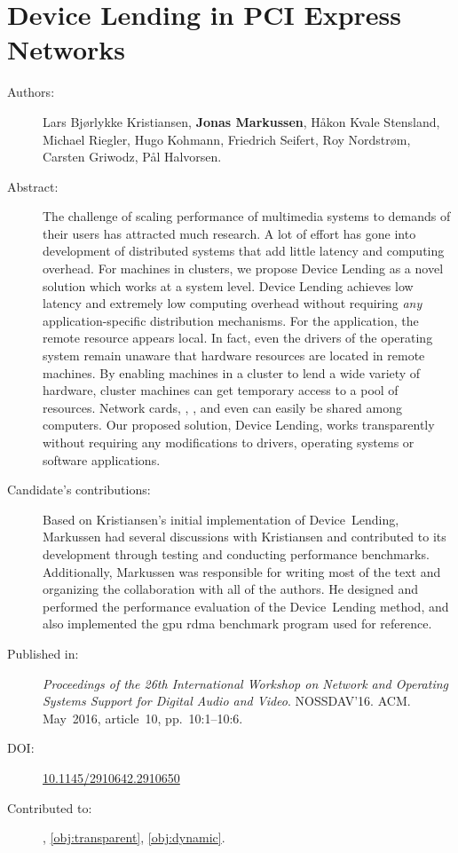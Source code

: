 \chapter{Device Lending in PCI Express Networks}
\label{paper:nossdav}
\paperthumb

\begin{description}
	\item[Authors:]
		Lars Bj{\o}rlykke Kristiansen, \textbf{Jonas Markussen}, H{\aa}kon Kvale Stensland,
		Michael Riegler, Hugo Kohmann, Friedrich Seifert, Roy Nordstr{\o}m, Carsten Griwodz, P{\aa}l Halvorsen.

	\item[Abstract:]
		The challenge of scaling  performance of multimedia systems to demands
		of their users has attracted much research.
		A lot of effort has gone into
		development of distributed systems that add little latency and computing overhead.
		For machines in  clusters,
		we propose Device Lending as a novel solution which works at a system
		level.
		Device Lending achieves low latency and extremely low computing overhead without
		requiring \textit{any} application-specific distribution mechanisms.
		For the application, the remote  resource appears local.
		In fact, even the drivers of the operating system remain unaware that
		hardware resources are located in remote machines.
		By enabling machines in a  cluster to lend a wide variety of hardware, 
		cluster machines can get temporary access to a pool of  resources. 
		Network cards, , , and even  can easily 
		be shared among computers.
		Our proposed solution, Device Lending, works transparently without requiring any modifications to drivers,
		operating systems or software applications.

	\item[Candidate's contributions:]
	    Based on Kristiansen's initial implementation of Device~Lending, Markussen had several discussions with Kristiansen and contributed to its development through testing and conducting performance benchmarks.
		Additionally, Markussen was responsible for writing most of the text and organizing the collaboration with all of the authors.
		He designed and performed the performance evaluation of the Device~Lending method, and also implemented the \acrshort{gpu} \acrshort{rdma} benchmark program used for reference.
		

	\item[Published in:]
		\emph{Proceedings of the 26th International Workshop on Network and Operating Systems Support for Digital Audio and Video}.
		NOSSDAV'16. ACM.
		May~2016, article~10, pp.~10:1--10:6.

	\item[DOI:] \href{https://doi.org/10.1145/2910642.2910650}{10.1145/2910642.2910650}

	\item[Contributed to:]
		, \cref{obj:transparent}, \cref{obj:dynamic}.

\end{description}

